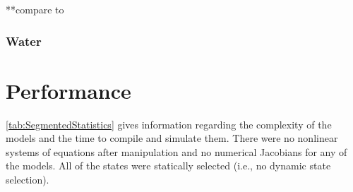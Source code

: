 **compare to~\cite{Franco2007}






\subsubsection{Water}


\section{Performance}

\autoref{tab:SegmentedStatistics} gives information regarding the complexity of the models and the time to compile and simulate them.  There were no nonlinear systems of equations after manipulation and no numerical Jacobians for any of the models.  All of the states were statically selected (i.e., no dynamic state selection).


%     
 
